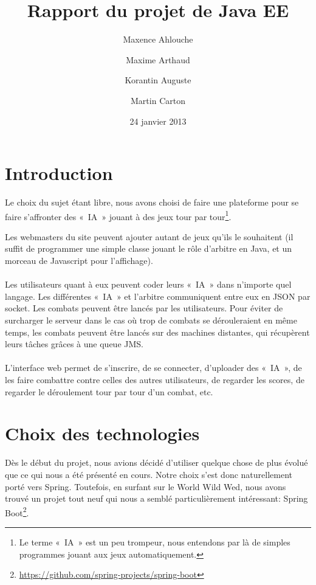 \documentclass[10pt]{scrartcl}
\begin{document}
\title{Rapport du projet de Java EE}
\author{Maxence Ahlouche \and Maxime Arthaud \and Korantin Auguste \and Martin Carton}

\date{24 janvier 2013}
\maketitle

\section{Introduction}
  Le choix du sujet étant libre, nous avons choisi de faire une plateforme pour
  se faire s'affronter des «~IA~» jouant à des jeux tour par tour\footnote{Le
  terme «~IA~» est un peu trompeur, nous entendons par là de simples programmes
  jouant aux jeux automatiquement.}.

  Les webmasters du site peuvent ajouter autant de jeux qu'ils le souhaitent
  (il suffit de programmer une simple classe jouant le rôle d'arbitre en Java,
  et un morceau de Javascript pour l'affichage).

  \paragraph{}
  Les utilisateurs quant à eux peuvent coder leurs «~IA~» dans n'importe quel
  langage. Les différentes «~IA~» et l'arbitre communiquent entre eux en JSON
  par socket. Les combats peuvent être lancés par les utilisateurs. Pour éviter
  de surcharger le serveur dans le cas où trop de combats se dérouleraient en
  même temps, les combats peuvent être lancés sur des machines distantes, qui
  récupèrent leurs tâches grâces à une queue JMS.

  \paragraph{}
  L'interface web permet de s'inscrire, de se connecter, d'uploader des «~IA~»,
  de les faire combattre contre celles des autres utilisateurs, de regarder les
  scores, de regarder le déroulement tour par tour d'un combat, etc.

\section{Choix des technologies}
  Dès le début du projet, nous avions décidé d'utiliser quelque chose
  de plus évolué que ce qui nous a été présenté en cours. Notre choix
  s'est donc naturellement porté vers Spring. Toutefois, en surfant
  sur le World Wild Wed, nous avons trouvé un projet tout neuf qui
  nous a semblé particulièrement intéressant: Spring
  Boot\footnote{\url{https://github.com/spring-projects/spring-boot}}.
\end{document}
